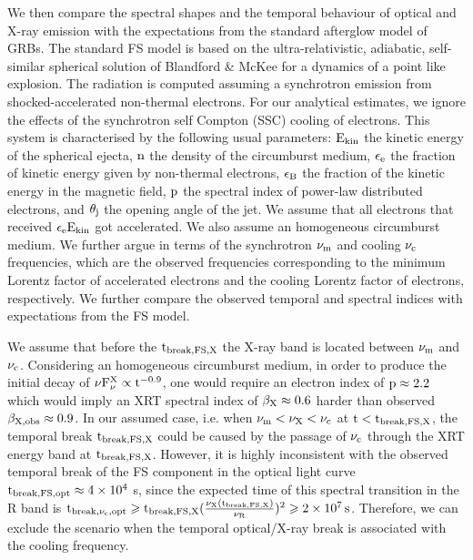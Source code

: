 \documentclass{naturesubmissionstyle}
\begin{document}
We then compare the spectral shapes and the temporal behaviour of optical and X-ray emission with the expectations from the standard afterglow model of GRBs\cite{Paczynski1993,Meszaros1997,Sari1998}. The standard FS model is based on the ultra-relativistic, adiabatic, self-similar spherical solution of Blandford $\&$ McKee for a dynamics of a point like explosion\cite{BM1976}. The radiation is computed assuming a synchrotron emission from shocked-accelerated non-thermal electrons. For our analytical estimates, we ignore the effects of the synchrotron self Compton (SSC) cooling of electrons. This system is characterised by the following usual parameters: $\rm E_{kin}$ the kinetic energy of the spherical ejecta, $\rm n$ the density of the circumburst medium, $\rm \epsilon_{e}$ the fraction of kinetic energy given by non-thermal electrons, $\rm \epsilon_{B}$ the fraction of the kinetic energy in the magnetic field, $\rm p$ the spectral index of power-law distributed electrons, and $\rm \theta_{j}$ the opening angle of the jet. We assume that all electrons that received $\rm \epsilon_{e} E_{kin}$ got accelerated. We also assume an homogeneous circumburst medium. We further argue in terms of the synchrotron $\rm \nu_{m}$ and cooling $\rm \nu_{c}$ frequencies, which are the observed frequencies corresponding to the minimum Lorentz factor of accelerated electrons and the cooling Lorentz factor of electrons, respectively. We further compare the observed temporal and spectral indices with expectations from the FS model\cite{Granot2002,Gao2013}.

We assume that before the $\rm t_{break,FS,X}$ the X-ray band is located between $\rm \nu_{m}$ and $\rm \nu_{c}$. Considering an homogeneous circumburst medium, in order to produce the initial decay of $\rm \nu F_{\nu}^{X} \propto t^{-0.9}$, one would require an electron index of $\rm p \approx 2.2$ which would imply an XRT spectral index of $\rm \beta_{X} \approx 0.6$ harder than observed $\rm \beta_{X,obs} \approx 0.9$. In our assumed case, i.e. when $\rm \nu_{m}<\nu_{X}<\nu_{c}$ at $\rm t<t_{break,FS,X}$, the temporal break $\rm t_{break,FS,X}$ could be caused by the passage of 
$\rm \nu_{c}$ through the XRT energy band at $\rm t_{break,FS,X}$. However, it is highly inconsistent with the observed temporal break of the FS component in the optical light curve $\rm t_{break,FS,opt} \approx 4 \times 10^{4} $ s, since the expected time of this spectral transition in the R band is $\rm t_{break,\nu_{c},opt} \geqslant t_{break,FS,X} (\frac{\nu_{X}(t_{break,FS,X})}{\nu_{R}})^{2} \geqslant 2 \times 10^{7} \, s$. Therefore, we can exclude the scenario when the temporal optical/X-ray break is associated with the cooling frequency. 
\end{document}
